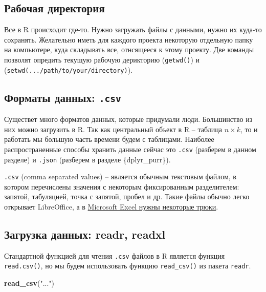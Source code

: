 \documentclass[]{book}
\newenvironment{Shaded}{\begin{snugshade}}{\end{snugshade}}
\newcommand{\KeywordTok}[1]{\textcolor[rgb]{0.13,0.29,0.53}{\textbf{#1}}}
\newcommand{\NormalTok}[1]{#1}
\newcommand{\StringTok}[1]{\textcolor[rgb]{0.31,0.60,0.02}{#1}}
\begin{document}
\hypertarget{section-4}{%
\subsection{Рабочая директория}\label{section-4}}

Все в R происходит где-то. Нужно загружать файлы с данными, нужно их куда-то сохранять. Желательно иметь для каждого проекта некоторую отдельную папку на компьютере, куда складывать все, отнсящееся к этому проекту. Две команды позволят опредить текущую рабочую дерикторию (\texttt{getwd()}) и (\texttt{setwd(.../path/to/your/directory)}).

\hypertarget{csv}{%
\subsection{\texorpdfstring{Форматы данных: \texttt{.csv}}{Форматы данных: .csv}}\label{csv}}

Существет много форматов данных, которые придумали люди. Большинство из них можно загрузить в R. Так как центральный объект в R -- таблица \(n \times k\), то и работать мы большую часть времени будем с таблицами. Наиболее распространенные способы хранить данные сейчас это \texttt{.csv} (разберем в данном разделе) и \texttt{.json} (разберем в разделе \citet{ref}\{dplyr\_purr\}).

\texttt{.csv} (comma separated values) -- является обычным текстовым файлом, в котором перечислены значения с некоторым фиксированным разделителем: запятой, табуляцией, точка с запятой, пробел и др. Такие файлы обычно легко открывает LibreOffice, а в \href{https://superuser.com/questions/291445/how-do-you-change-default-delimiter-in-the-text-import-in-excel}{Microsoft Excel нужны некоторые трюки}.

\hypertarget{readr-readxl}{%
\subsection{Загрузка данных: readr, readxl}\label{readr-readxl}}

Стандартной функцией для чтения \texttt{.csv} файлов в R является функция \texttt{read.csv()}, но мы будем использовать функцию \texttt{read\_csv()} из пакета \texttt{readr}.

\begin{Shaded}
\begin{Highlighting}[]
\KeywordTok{read_csv}\NormalTok{(}\StringTok{"..."}\NormalTok{)}
\end{Highlighting}
\end{Shaded}
\end{document}
